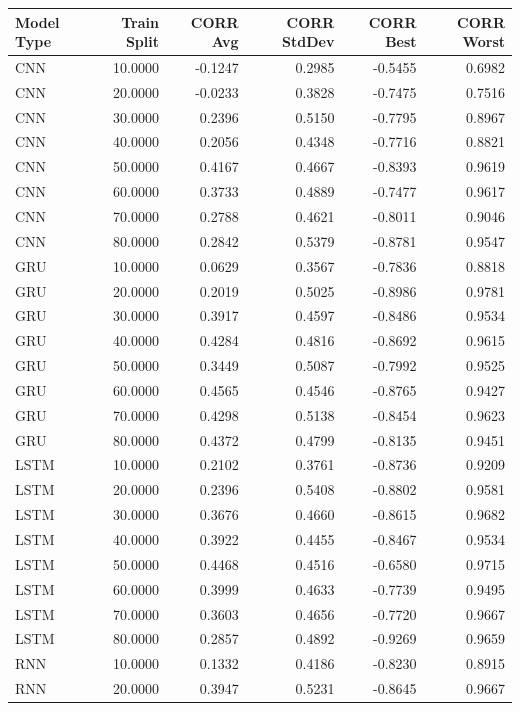 \begin{tabular}{lrrrrr}
\toprule
Model Type & Train Split & CORR Avg & CORR StdDev & CORR Best & CORR Worst \\
\midrule
CNN & 10.0000 & -0.1247 & 0.2985 & -0.5455 & 0.6982 \\
CNN & 20.0000 & -0.0233 & 0.3828 & -0.7475 & 0.7516 \\
CNN & 30.0000 & 0.2396 & 0.5150 & -0.7795 & 0.8967 \\
CNN & 40.0000 & 0.2056 & 0.4348 & -0.7716 & 0.8821 \\
CNN & 50.0000 & 0.4167 & 0.4667 & -0.8393 & 0.9619 \\
CNN & 60.0000 & 0.3733 & 0.4889 & -0.7477 & 0.9617 \\
CNN & 70.0000 & 0.2788 & 0.4621 & -0.8011 & 0.9046 \\
CNN & 80.0000 & 0.2842 & 0.5379 & -0.8781 & 0.9547 \\
GRU & 10.0000 & 0.0629 & 0.3567 & -0.7836 & 0.8818 \\
GRU & 20.0000 & 0.2019 & 0.5025 & -0.8986 & 0.9781 \\
GRU & 30.0000 & 0.3917 & 0.4597 & -0.8486 & 0.9534 \\
GRU & 40.0000 & 0.4284 & 0.4816 & -0.8692 & 0.9615 \\
GRU & 50.0000 & 0.3449 & 0.5087 & -0.7992 & 0.9525 \\
GRU & 60.0000 & 0.4565 & 0.4546 & -0.8765 & 0.9427 \\
GRU & 70.0000 & 0.4298 & 0.5138 & -0.8454 & 0.9623 \\
GRU & 80.0000 & 0.4372 & 0.4799 & -0.8135 & 0.9451 \\
LSTM & 10.0000 & 0.2102 & 0.3761 & -0.8736 & 0.9209 \\
LSTM & 20.0000 & 0.2396 & 0.5408 & -0.8802 & 0.9581 \\
LSTM & 30.0000 & 0.3676 & 0.4660 & -0.8615 & 0.9682 \\
LSTM & 40.0000 & 0.3922 & 0.4455 & -0.8467 & 0.9534 \\
LSTM & 50.0000 & 0.4468 & 0.4516 & -0.6580 & 0.9715 \\
LSTM & 60.0000 & 0.3999 & 0.4633 & -0.7739 & 0.9495 \\
LSTM & 70.0000 & 0.3603 & 0.4656 & -0.7720 & 0.9667 \\
LSTM & 80.0000 & 0.2857 & 0.4892 & -0.9269 & 0.9659 \\
RNN & 10.0000 & 0.1332 & 0.4186 & -0.8230 & 0.8915 \\
RNN & 20.0000 & 0.3947 & 0.5231 & -0.8645 & 0.9667 \\

\end{tabular}
